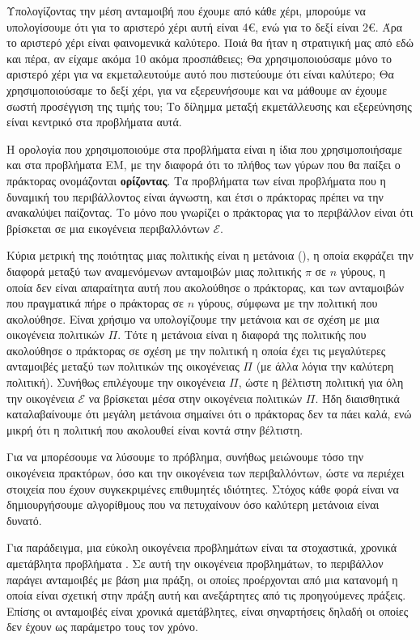 Υπολογίζοντας την μέση ανταμοιβή που έχουμε από κάθε χέρι, μπορούμε να υπολογίσουμε ότι για το αριστερό χέρι αυτή είναι 4€, ενώ για το δεξί είναι 2€. Άρα το αριστερό χέρι είναι φαινομενικά καλύτερο. Ποιά θα ήταν η στρατιγική μας από εδώ και πέρα, αν είχαμε ακόμα 10 ακόμα προσπάθειες; Θα χρησιμοποιούσαμε μόνο το αριστερό χέρι για να εκμεταλευτούμε αυτό που πιστεύουμε ότι είναι καλύτερο; Θα χρησιμοποιούσαμε το δεξί χέρι, για να εξερευνήσουμε και να μάθουμε αν έχουμε σωστή προσέγγιση της τιμής του; Το δίλημμα μεταξή εκμετάλλευσης και εξερεύνησης είναι κεντρικό στα προβλήματα αυτά.

Η ορολογία που χρησιμοποιούμε στα προβλήματα  είναι η ίδια που χρησιμοποιήσαμε και στα προβλήματα ΕΜ, με την διαφορά ότι το πλήθος των γύρων που θα παίξει ο πράκτορας ονομάζονται \textbf{ορίζοντας}. Τα προβλήματα των  είναι προβλήματα που η δυναμική του περιβάλλοντος είναι άγνωστη, και έτσι ο πράκτορας πρέπει να την ανακαλύψει παίζοντας. Το μόνο που γνωρίζει ο πράκτορας για το περιβάλλον είναι ότι βρίσκεται σε μια εικογένεια περιβαλλόντων $\mathcal{E}$.

Κύρια μετρική της ποιότητας μιας πολιτικής είναι η μετάνοια (), η οποία εκφράζει την διαφορά μεταξύ των αναμενόμενων ανταμοιβών μιας πολιτικής $π$ σε $n$ γύρους, η οποία δεν είναι απαραίτητα αυτή που ακολούθησε ο πράκτορας, και των ανταμοιβών που πραγματικά πήρε ο πράκτορας σε $n$ γύρους, σύμφωνα με την πολιτική που ακολούθησε. Είναι χρήσιμο να υπολογίζουμε την μετάνοια και σε σχέση με μια οικογένεια πολιτικών $Π$. Τότε η μετάνοια είναι η διαφορά της πολιτικής που ακολούθησε ο πράκτορας σε σχέση με την πολιτική η οποία έχει τις μεγαλύτερες ανταμοιβές μεταξύ των πολιτικών της οικογένειας $Π$ (με άλλα λόγια την καλύτερη πολιτική). Συνήθως επιλέγουμε την οικογένεια $Π$, ώστε η βέλτιστη πολιτική για όλη την οικογένεια $\mathcal{E}$ να βρίσκεται μέσα στην οικογένεια πολιτικών $Π$. Ήδη διαισθητικά καταλαβαίνουμε ότι μεγάλη μετάνοια σημαίνει ότι ο πράκτορας δεν τα πάει καλά, ενώ μικρή ότι η πολιτική που ακολουθεί είναι κοντά στην βέλτιστη. 

Για να μπορέσουμε να λύσουμε το πρόβλημα, συνήθως μειώνουμε τόσο την οικογένεια πρακτόρων, όσο και την οικογένεια των περιβαλλόντων, ώστε να περιέχει στοιχεία που έχουν συγκεκριμένες επιθυμητές ιδιότητες. Στόχος κάθε φορά είναι να δημιουργήσουμε αλγορίθμους που να πετυχαίνουν όσο καλύτερη μετάνοια είναι δυνατό.

Για παράδειγμα, μια εύκολη οικογένεια προβλημάτων είναι τα στοχαστικά, χρονικά αμετάβλητα προβλήματα . Σε αυτή την οικογένεια προβλημάτων, το περιβάλλον παράγει ανταμοιβές με βάση μια πράξη, οι οποίες προέρχονται από μια κατανομή η οποία είναι σχετική στην πράξη αυτή και ανεξάρτητες από τις προηγούμενες πράξεις. Επίσης οι ανταμοιβές είναι χρονικά αμετάβλητες, είναι σηναρτήσεις δηλαδή οι οποίες δεν έχουν ως παράμετρο τους τον χρόνο. 

